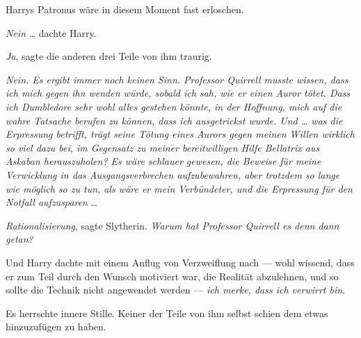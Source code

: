Harrys Patronus wäre in diesem Moment fast erloschen.

\emph{Nein} … dachte Harry.

\emph{Ja}, sagte die anderen drei Teile von ihm traurig.

\emph{Nein. Es ergibt immer noch keinen Sinn. Professor Quirrell musste wissen, dass ich mich gegen ihn wenden würde, sobald ich sah, wie er einen Auror tötet. Dass ich Dumbledore sehr wohl alles gestehen könnte, in der Hoffnung, mich auf die wahre Tatsache berufen zu können, dass ich ausgetrickst wurde. Und … was die Erpressung betrifft, trägt seine Tötung eines Aurors gegen meinen Willen wirklich so viel dazu bei, im Gegensatz zu meiner bereitwilligen Hilfe Bellatrix aus Askaban herauszuholen? Es wäre schlauer gewesen, die Beweise für meine Verwicklung in das Ausgangsverbrechen aufzubewahren, aber trotzdem so lange wie möglich so zu tun, als wäre er mein Verbündeter, und die Erpressung für den Notfall aufzusparen} …

\emph{Rationalisierung}, sagte Slytherin. \emph{Warum hat Professor Quirrell es denn dann getan?}

Und Harry dachte mit einem Anflug von Verzweiflung nach — wohl wissend, dass er zum Teil durch den Wunsch motiviert war, die Realität abzulehnen, und so sollte die Technik nicht angewendet werden — \emph{ich merke, dass ich verwirrt bin}.

Es herrschte innere Stille. Keiner der Teile von ihm selbst schien dem etwas hinzuzufügen zu haben.

